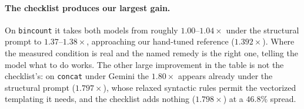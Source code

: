 \begin{table}[t]
\centering
\footnotesize
\setlength{\tabcolsep}{2pt}
\caption{Effect of converting profiling metrics into a prescriptive checklist (\emph{diag}), against
  the constrained (\emph{base}) and relaxed (\emph{struct}) prompts. Speedups are interleaved medians
  against the unmodified program on one GH200. \textbf{Bold} marks the cases discussed in the text.
  ``spread'' is the largest repetition spread across the four arms. \texttt{chemv} is excluded
  (see text).}
\label{tab:guidvar}
\end{table}

\paragraph{The checklist produces our largest gain.}
On \texttt{bincount} it takes both models from roughly $1.00$--$1.04\times$ under the structural prompt
to $1.37$--$1.38\times$, approaching our hand-tuned reference ($1.392\times$). Where the measured
condition is real and the named remedy is the right one, telling the model what to do works. The
other large improvement in the table is not the checklist's: on \texttt{concat} under Gemini the
$1.80\times$ appears already under the structural prompt ($1.797\times$), whose relaxed syntactic
rules permit the vectorized templating it needs, and the checklist adds nothing ($1.798\times$) at a
$46.8\%$ spread.

